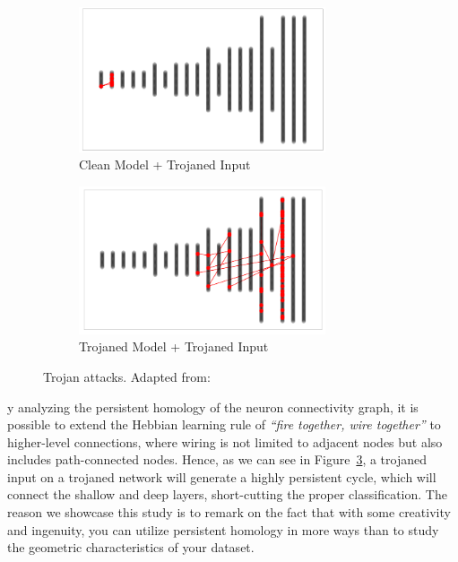 \documentclass[../main.tex]{subfiles}
\begin{document}
\begin{figure}[ht!]
     \centering
    \begin{subfigure}[b]{0.45\textwidth}
         \centering
         \includegraphics[width=0.8\textwidth]{figures/bg/noTrojan.png}
        \caption{Clean Model + Trojaned Input}
         \label{fig:noTrojan}
     \end{subfigure}
      \begin{subfigure}[b]{0.45\textwidth}
         \centering
         \includegraphics[width=0.8\textwidth]{figures/bg/withTrojan.png}
        \caption{Trojaned Model + Trojaned Input}
         \label{fig:withTrojan}
     \end{subfigure}
    \caption{Trojan attacks. Adapted from: \cite{zheng_topological_2022}}
    \label{fig:trojan}
\end{figure}

y analyzing the persistent homology of the neuron connectivity graph, it is possible to extend the Hebbian learning rule of \textit{``fire together, wire together''} to higher-level connections, where wiring is not limited to adjacent nodes but also includes path-connected nodes. Hence, as we can see in Figure~\ref{fig:trojan}, a trojaned input on a trojaned network will generate a highly persistent cycle, which will connect the shallow and deep layers, short-cutting the proper classification. The reason we showcase this study is to remark on the fact that with some creativity and ingenuity, you can utilize persistent homology in more ways than to study the geometric characteristics of your dataset.\\
\end{document}
